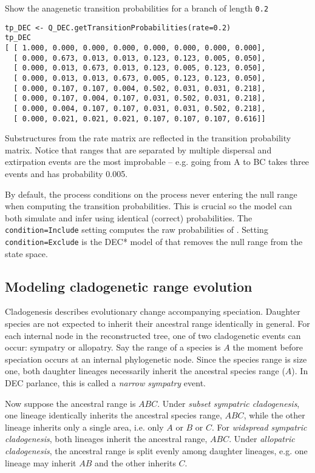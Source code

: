 Show the anagenetic transition probabilities for a branch of length {\tt 0.2}

\begin{snugshade}
\begin{lstlisting}
tp_DEC <- Q_DEC.getTransitionProbabilities(rate=0.2)
tp_DEC
[ [ 1.000, 0.000, 0.000, 0.000, 0.000, 0.000, 0.000, 0.000],
  [ 0.000, 0.673, 0.013, 0.013, 0.123, 0.123, 0.005, 0.050],
  [ 0.000, 0.013, 0.673, 0.013, 0.123, 0.005, 0.123, 0.050],
  [ 0.000, 0.013, 0.013, 0.673, 0.005, 0.123, 0.123, 0.050],
  [ 0.000, 0.107, 0.107, 0.004, 0.502, 0.031, 0.031, 0.218],
  [ 0.000, 0.107, 0.004, 0.107, 0.031, 0.502, 0.031, 0.218],
  [ 0.000, 0.004, 0.107, 0.107, 0.031, 0.031, 0.502, 0.218],
  [ 0.000, 0.021, 0.021, 0.021, 0.107, 0.107, 0.107, 0.616]]
\end{lstlisting}
\end{snugshade}

Substructures from the rate matrix are reflected in the transition probability matrix.
Notice that ranges that are separated by multiple dispersal and extirpation events are the most improbable -- e.g. going from A to BC takes three events and has probability 0.005.

By default, the process conditions on the process never entering the null range when computing the transition probabilities.
This is crucial so the model can both simulate and infer using identical (correct) probabilities.
The  {\tt condition=Include} setting computes the raw probabilities of \citep{ree05}.
Setting {\tt condition=Exclude} is the DEC* model of \citep{massana15} that removes the null range from the state space.

\subsection{Modeling cladogenetic range evolution}

Cladogenesis describes evolutionary change accompanying speciation.
Daughter species are not expected to inherit their ancestral range identically in general.
For each internal node in the reconstructed tree, one of two cladogenetic events can occur: sympatry or allopatry.
Say the range of a species is $A$ the moment before speciation occurs at an internal phylogenetic node.
Since the species range is size one, both daughter lineages necessarily inherit the ancestral species range ($A$).
In DEC parlance, this is called a {\it narrow sympatry} event.

Now suppose the ancestral range is $ABC$.
Under {\it subset sympatric cladogenesis}, one lineage identically inherits the ancestral species range, $ABC$, while the other lineage inherits only a single area, i.e. only $A$ or $B$ or $C$.
For {\it widspread sympatric cladogenesis}, both lineages inherit the ancestral range, $ABC$.
Under {\it allopatric cladogenesis}, the ancestral range is split evenly among daughter lineages, e.g. one lineage may inherit $AB$ and the other inherits $C$.

